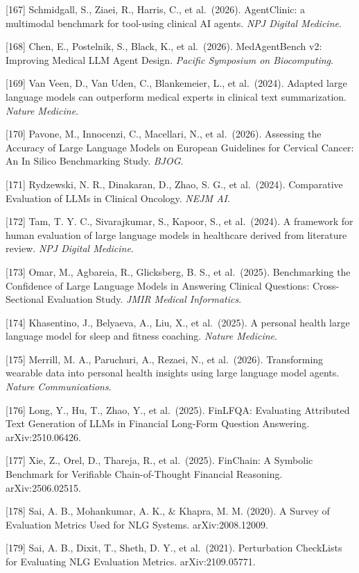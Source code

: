 {[}167{]} Schmidgall, S., Ziaei, R., Harris, C., et al.~(2026). AgentClinic: a multimodal benchmark for tool-using clinical AI agents. \emph{NPJ Digital Medicine}.

{[}168{]} Chen, E., Postelnik, S., Black, K., et al.~(2026). MedAgentBench v2: Improving Medical LLM Agent Design. \emph{Pacific Symposium on Biocomputing}.

{[}169{]} Van Veen, D., Van Uden, C., Blankemeier, L., et al.~(2024). Adapted large language models can outperform medical experts in clinical text summarization. \emph{Nature Medicine}.

{[}170{]} Pavone, M., Innocenzi, C., Macellari, N., et al.~(2026). Assessing the Accuracy of Large Language Models on European Guidelines for Cervical Cancer: An In Silico Benchmarking Study. \emph{BJOG}.

{[}171{]} Rydzewski, N. R., Dinakaran, D., Zhao, S. G., et al.~(2024). Comparative Evaluation of LLMs in Clinical Oncology. \emph{NEJM AI}.

{[}172{]} Tam, T. Y. C., Sivarajkumar, S., Kapoor, S., et al.~(2024). A framework for human evaluation of large language models in healthcare derived from literature review. \emph{NPJ Digital Medicine}.

{[}173{]} Omar, M., Agbareia, R., Glicksberg, B. S., et al.~(2025). Benchmarking the Confidence of Large Language Models in Answering Clinical Questions: Cross-Sectional Evaluation Study. \emph{JMIR Medical Informatics}.

{[}174{]} Khasentino, J., Belyaeva, A., Liu, X., et al.~(2025). A personal health large language model for sleep and fitness coaching. \emph{Nature Medicine}.

{[}175{]} Merrill, M. A., Paruchuri, A., Rezaei, N., et al.~(2026). Transforming wearable data into personal health insights using large language model agents. \emph{Nature Communications}.

{[}176{]} Long, Y., Hu, T., Zhao, Y., et al.~(2025). FinLFQA: Evaluating Attributed Text Generation of LLMs in Financial Long-Form Question Answering. arXiv:2510.06426.

{[}177{]} Xie, Z., Orel, D., Thareja, R., et al.~(2025). FinChain: A Symbolic Benchmark for Verifiable Chain-of-Thought Financial Reasoning. arXiv:2506.02515.

{[}178{]} Sai, A. B., Mohankumar, A. K., \& Khapra, M. M. (2020). A Survey of Evaluation Metrics Used for NLG Systems. arXiv:2008.12009.

{[}179{]} Sai, A. B., Dixit, T., Sheth, D. Y., et al.~(2021). Perturbation CheckLists for Evaluating NLG Evaluation Metrics. arXiv:2109.05771.

